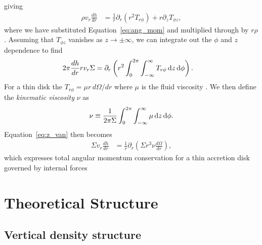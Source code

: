 giving
\begin{align}
    \rho v_r \frac{dh}{dr} &= \frac{1}{r} \partial_r (r^2 T_{r\phi}) + r \partial_z T_{\phi z},
\end{align}
where we have substituted Equation~\eqref{eq:ang_mom} and multiplied through by $r \rho$.
Assuming that $T_{\phi z}$ vanishes as $z\rightarrow\pm\infty$, we can integrate out the $\phi$ and $z$ dependence to find
\begin{align}
    2\pi \frac{dh}{dr} r v_r \Sigma &= \partial_r \left( r^2 \int_0^{2\pi} \int_{-\infty}^\infty T_{r\phi} \mathop{}\!\mathrm{d}{z} \mathop{}\!\mathrm{d}{\phi} \right). \label{eq:z_van}
\end{align}
For a thin disk the $T_{r\phi}=\mu r \, d\Omega/dr$ where $\mu$ is the fluid viscosity \citep[see review by][]{papaloizou1995}.
We then define the \textit{kinematic viscosity} $\nu$ as
\begin{align}
    \nu \equiv \frac{1}{2 \pi \Sigma} \int_0^{2\pi} \int_{-\infty}^\infty \mu \mathop{}\!\mathrm{d}{z} \mathop{}\!\mathrm{d}{\phi}.
\end{align}
Equation~\eqref{eq:z_van} then becomes
\begin{align}
    \Sigma v_r \frac{dh}{dr} &= \frac{1}{r} \partial_r \left( \Sigma r^3 \nu \frac{d\Omega}{dr} \right), \label{eq:1d_angmom}
\end{align}
which expresses total angular momentum conservation for a thin accretion disk governed by internal forces \citep{pringle1981}

\section{Theoretical Structure}

\subsection{Vertical density structure}

